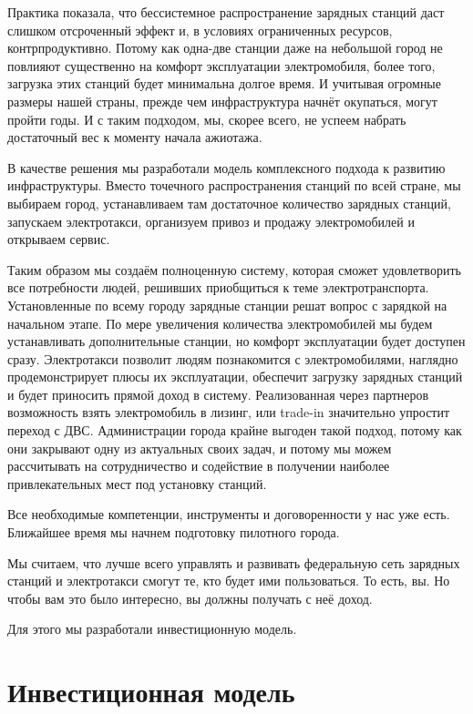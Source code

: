 \documentclass[a4paper,12pt]{report}
\begin{document}
Практика показала, что бессистемное распространение зарядных станций даст слишком отсроченный эффект и, в условиях ограниченных ресурсов, контрпродуктивно. Потому как одна-две станции даже на небольшой город не повлияют существенно на комфорт эксплуатации электромобиля, более того, загрузка этих станций будет минимальна долгое время. И учитывая огромные размеры нашей страны, прежде чем инфраструктура начнёт окупаться, могут пройти годы. И с таким подходом, мы, скорее всего, не успеем набрать достаточный вес к моменту начала ажиотажа. 

В качестве решения мы разработали модель комплексного подхода к развитию инфраструктуры. Вместо точечного распространения станций по всей стране, мы выбираем город, устанавливаем там достаточное количество зарядных станций, запускаем электротакси, организуем привоз и продажу электромобилей и открываем сервис. 

Таким образом мы создаём полноценную систему, которая сможет удовлетворить все потребности людей, решивших приобщиться к теме электротранспорта. Установленные по всему городу зарядные станции решат вопрос с зарядкой на начальном этапе. По мере увеличения количества электромобилей мы будем устанавливать дополнительные станции, но комфорт эксплуатации будет доступен сразу. Электротакси позволит людям познакомится с электромобилями, наглядно продемонстрирует плюсы их эксплуатации, обеспечит загрузку зарядных станций и будет приносить прямой доход в систему. Реализованная через партнеров возможность взять электромобиль в лизинг, или trade-in значительно упростит переход с ДВС. Администрации города крайне выгоден такой подход, потому как они закрывают одну из актуальных своих задач, и потому мы можем рассчитывать на сотрудничество и содействие в получении наиболее привлекательных мест под установку станций. 

Все необходимые компетенции, инструменты и договоренности у нас уже есть. Ближайшее время мы начнем подготовку пилотного города. 

Мы считаем, что лучше всего управлять и развивать федеральную сеть зарядных станций и электротакси смогут те, кто будет ими пользоваться. То есть, вы. Но чтобы вам это было интересно, вы должны получать с неё доход. 

Для этого мы разработали инвестиционную модель. 





\chapter{Инвестиционная модель}
\end{document}
